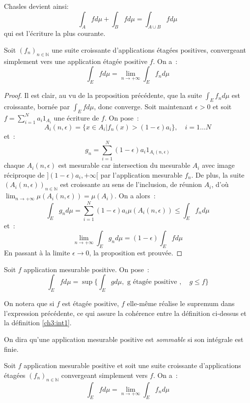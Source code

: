 Chasles devient ainsi:
\[
\int_A f d \mu  + \int_B f d \mu= \int_{A\cup B} f d\mu
\]
qui est l'écriture la plus courante.
\begin{mandatory}
\begin{prop}
Soit $(f_n)_{n \in \mathbb{N}}$ une suite croissante d'applications
étagées positives, convergeant simplement vers une application étagée
positive $f$. On a~:
\[
\int_E f d\mu = \lim_{n\to +\infty} \int_E f_n d \mu
\]
\end{prop}
\end{mandatory}
\begin{proof}
Il est clair, au vu de la proposition précédente, que la suite $\int_E
f_n d \mu$ est croissante, bornée par $\int_E f d \mu$, donc
converge. Soit maintenant $\epsilon > 0$ et soit $f = \sum_{i=1}^N a_i
1_{A_i}$ une écriture de $f$. On pose~:
\[
A_i(n,\epsilon) = \{ x \in A_i | f_n(x) > (1-\epsilon)a_i \}, \quad
i=1\dots N
\]
et~:
\[
g_n = \sum_{i=1}^N (1-\epsilon)a_i 1_{A_i(n,\epsilon)}
\]
chaque $A_i(n,\epsilon)$ est mesurable car intersection du mesurable $A_i$
avec image réciproque de $](1-\epsilon)a_i, +\infty[$ par l'application
mesurable $f_n$. De plus, la suite $(A_i(n,\epsilon))_{n\in \mathbb{N}}$ est croissante au sens de
l'inclusion, de réunion $A_i$, d'où $\lim_{n\to+\infty}
\mu(A_i(n,\epsilon)) = \mu(A_i)$.
On a alors~:
\[
\int_E g_n d\mu = \sum_{i=1}^N (1-\epsilon)a_i \mu(A_i(n,\epsilon))
\leq \int_E f_n d \mu
\]
et~:
\[
\lim_{n\to+\infty} \int_E g_n d \mu = (1-\epsilon)\int_E f d\mu
\]
En passant à la limite $\epsilon \to 0$, la proposition est prouvée.
\end{proof}
\begin{mandatory}
\begin{defn}
Soit $f$ application mesurable positive. On pose~:
\[
\int_E f d\mu = \sup \{ \int_E g d \mu,  \mbox{ g étagée positive },
\quad g \leq f \}
\]
\end{defn}
\end{mandatory}
\begin{rem}
On notera que si $f$ est étagée positive, $f$ elle-même réalise le supremum
dans l'expression précédente, ce qui assure la cohérence entre la définition
ci-dessus et la définition \ref{ch3:int1}.
\end{rem}
\begin{term}
On dira qu'une application mesurable positive est {\em sommable} si
son intégrale est finie.
\end{term}
\begin{mandatory}
\begin{prop}\label{ch2:2}
Soit $f$ application mesurable positive et soit une suite croissante d'applications étagées $(f_n)_{n \in
\mathbb{N}}$ convergeant
simplement vers $f$. On a~:
\[
\int_E f d\mu = \lim_{n \to +\infty} \int_E f_n d\mu
\]
\end{prop}
\end{mandatory}
